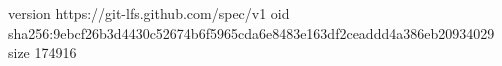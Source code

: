 version https://git-lfs.github.com/spec/v1
oid sha256:9ebcf26b3d4430c52674b6f5965cda6e8483e163df2ceaddd4a386eb20934029
size 174916
